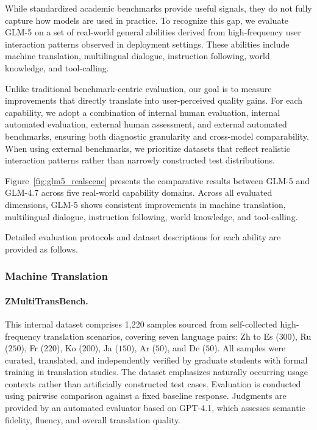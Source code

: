 \documentclass{article}
\theoremstyle{definition}
\begin{document}
While standardized academic benchmarks provide useful signals, they do not fully capture how models are used in practice. To recognize this gap, we evaluate GLM-5 on a set of real-world general abilities derived from high-frequency user interaction patterns observed in deployment settings. These abilities include {machine translation, multilingual dialogue, instruction following, world knowledge, and tool-calling}.

Unlike traditional benchmark-centric evaluation, our goal is to measure improvements that directly translate into user-perceived quality gains. For each capability, we adopt a combination of internal human evaluation, internal automated evaluation, external human assessment, and external automated benchmarks, ensuring both diagnostic granularity and cross-model comparability. When using external benchmarks, we prioritize datasets that reflect realistic interaction patterns rather than narrowly constructed test distributions.

Figure~\ref{fig:glm5_realscene} presents the comparative results between GLM-5 and GLM-4.7 across five real-world capability domains. Across all evaluated dimensions, GLM-5 shows consistent improvements in machine translation, multilingual dialogue, instruction following, world knowledge, and tool-calling.

Detailed evaluation protocols and dataset descriptions for each ability are provided as follows. 

\subsubsection{Machine Translation}

\paragraph{ZMultiTransBench.} 
This internal dataset comprises 1,220 samples sourced from self-collected high-frequency translation scenarios, covering seven language pairs: Zh to Es (\(300\)), Ru (\(250\)), Fr (\(220\)), Ko (\(200\)), Ja (\(150\)), Ar (\(50\)), and De (\(50\)). All samples were curated, translated, and independently verified by graduate students with formal training in translation studies. The dataset emphasizes naturally occurring usage contexts rather than artificially constructed test cases. Evaluation is conducted using pairwise comparison against a fixed baseline response. Judgments are provided by an automated evaluator based on GPT-4.1, which assesses semantic fidelity, fluency, and overall translation quality.
\end{document}
